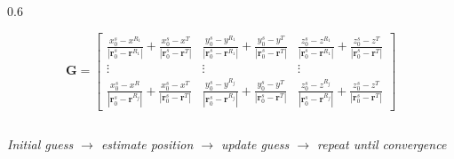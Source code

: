 \begin{frame}[t, label=gnss_ls]
\begin{columns}[t]
\begin{column}{0.6\linewidth}
{\begin{itemize}
            \end{itemize}} \scriptsize
            \begin{equation*}
                \mathbf{G} = 
                \begin{bmatrix} 
                    \frac{x_{0}^s - x^{R_1}}{|\mathbf{r}_0^s - \mathbf{r}^{R_1}|} +  \frac{x_{0}^s - x^{T}}{|\mathbf{r}_0^s - \mathbf{r}^{T}|} & 
                    \frac{y_{0}^s - y^{R_1}}{|\mathbf{r}_0^s - \mathbf{r}^{R_1}|} +  \frac{y_{0}^s - y^{T}}{|\mathbf{r}_0^s - \mathbf{r}^{T}|} & 
                    \frac{z_{0}^s - z^{R_1}}{|\mathbf{r}_0^s - \mathbf{r}^{R_1}|} +  \frac{z_{0}^s - z^{T}}{|\mathbf{r}_0^s - \mathbf{r}^{T}|}  \\ 
                    \vdots & \vdots & \vdots  \\ 
                    \frac{x_{0}^s - x^{R}}{|\mathbf{r}_0^s - \mathbf{r}^{R_j}|} +  \frac{x_{0}^s - x^{T}}{|\mathbf{r}_0^s - \mathbf{r}^{T}|} & 
                    \frac{y_{0}^s - y^{R_j}}{|\mathbf{r}_0^s - \mathbf{r}^{R_j}|} +  \frac{y_{0}^s - y^{T}}{|\mathbf{r}_0^s - \mathbf{r}^{T}|} & 
                    \frac{z_{0}^s - z^{R_j}}{|\mathbf{r}_0^s - \mathbf{r}^{R_j}|} +  \frac{z_{0}^s - z^{T}}{|\mathbf{r}_0^s - \mathbf{r}^{T}|}  
                \end{bmatrix}
            \end{equation*}
        \end{column}
    \end{columns}
    \textit{Initial guess \(\xrightarrow[]{}\) estimate position \(\xrightarrow[]{}\) update guess \(\xrightarrow[]{}\) repeat until convergence}
\end{frame}